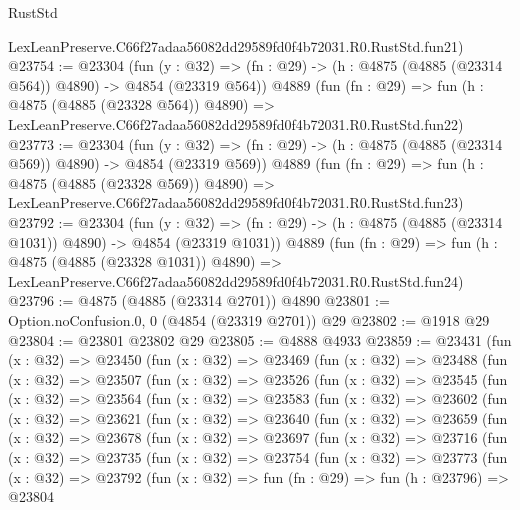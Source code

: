 \begin{lexlean}{RustStd}
\begin{coremodule}
    LexLeanPreserve.C66f27adaa56082dd29589fd0f4b72031.R0.RustStd.fun21)
@23754 := @23304
    (fun (y : @32) => (fn : @29) -> (h : @4875 (@4885 (@23314 @564)) @4890) -> @4854 (@23319 @564))
    @4889
    (fun (fn : @29) =>
    fun (h : @4875 (@4885 (@23328 @564)) @4890) =>
    LexLeanPreserve.C66f27adaa56082dd29589fd0f4b72031.R0.RustStd.fun22)
@23773 := @23304
    (fun (y : @32) => (fn : @29) -> (h : @4875 (@4885 (@23314 @569)) @4890) -> @4854 (@23319 @569))
    @4889
    (fun (fn : @29) =>
    fun (h : @4875 (@4885 (@23328 @569)) @4890) =>
    LexLeanPreserve.C66f27adaa56082dd29589fd0f4b72031.R0.RustStd.fun23)
@23792 := @23304
    (fun (y : @32) =>
    (fn : @29) -> (h : @4875 (@4885 (@23314 @1031)) @4890) -> @4854 (@23319 @1031))
    @4889
    (fun (fn : @29) =>
    fun (h : @4875 (@4885 (@23328 @1031)) @4890) =>
    LexLeanPreserve.C66f27adaa56082dd29589fd0f4b72031.R0.RustStd.fun24)
@23796 := @4875 (@4885 (@23314 @2701)) @4890
@23801 := Option.noConfusion.{0, 0} (@4854 (@23319 @2701)) @29
@23802 := @1918 @29
@23804 := @23801 @23802 @29
@23805 := @4888 @4933
@23859 := @23431
    (fun (x : @32) =>
    @23450
      (fun (x : @32) =>
      @23469
        (fun (x : @32) =>
        @23488
          (fun (x : @32) =>
          @23507
            (fun (x : @32) =>
            @23526
              (fun (x : @32) =>
              @23545
                (fun (x : @32) =>
                @23564
                  (fun (x : @32) =>
                  @23583
                    (fun (x : @32) =>
                    @23602
                      (fun (x : @32) =>
                      @23621
                        (fun (x : @32) =>
                        @23640
                          (fun (x : @32) =>
                          @23659
                            (fun (x : @32) =>
                            @23678
                              (fun (x : @32) =>
                              @23697
                                (fun (x : @32) =>
                                @23716
                                  (fun (x : @32) =>
                                  @23735
                                    (fun (x : @32) =>
                                    @23754
                                      (fun (x : @32) =>
                                      @23773
                                        (fun (x : @32) =>
                                        @23792
                                          (fun (x : @32) =>
                                          fun (fn : @29) =>
                                          fun (h : @23796) =>
                                          @23804

\end{coremodule}
\end{lexlean}
